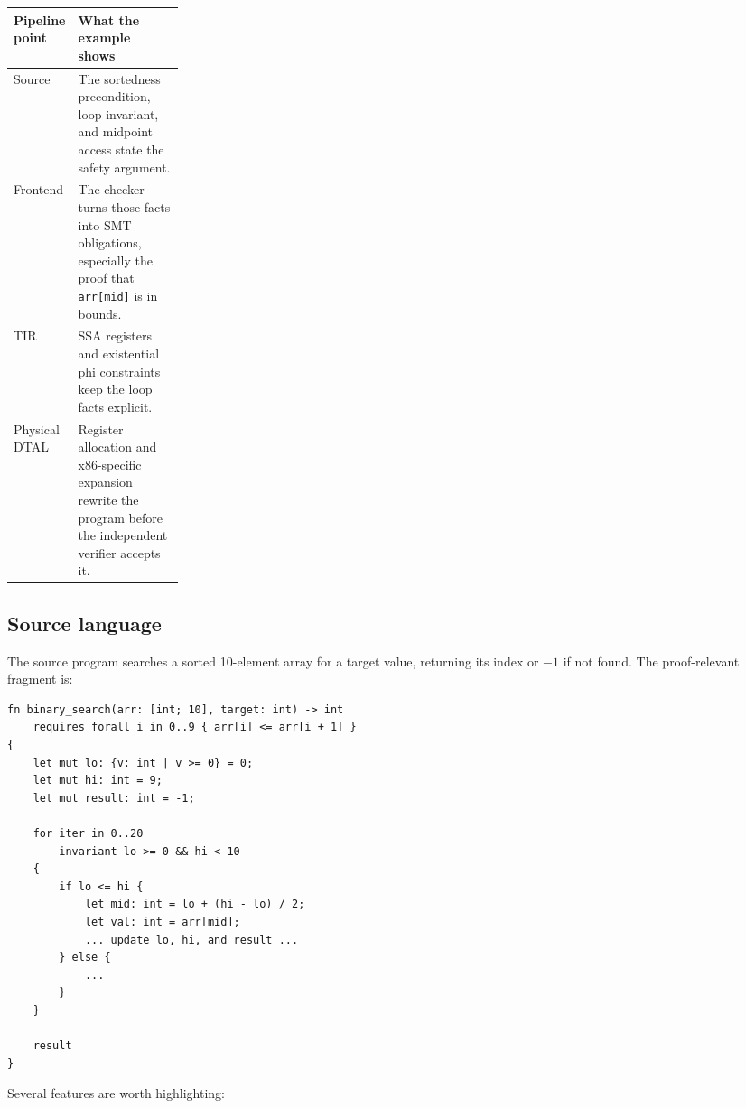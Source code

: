 \begin{center}
\small
\begin{tabularx}{0.96\linewidth}{@{}p{0.22\linewidth}X@{}}
\toprule
\textbf{Pipeline point} & \textbf{What the example shows} \\
\midrule
Source & The sortedness precondition, loop invariant, and midpoint access state the safety argument. \\
Frontend & The checker turns those facts into SMT obligations, especially the proof that \texttt{arr[mid]} is in bounds. \\
TIR & SSA registers and existential phi constraints keep the loop facts explicit. \\
Physical DTAL & Register allocation and x86-specific expansion rewrite the program before the independent verifier accepts it. \\
\bottomrule
\end{tabularx}
\end{center}

\subsection{Source language}
The source program searches a sorted 10-element array for a target value, returning its index or $-1$ if not found. The proof-relevant fragment is:
\begin{verbatim}
fn binary_search(arr: [int; 10], target: int) -> int
    requires forall i in 0..9 { arr[i] <= arr[i + 1] }
{
    let mut lo: {v: int | v >= 0} = 0;
    let mut hi: int = 9;
    let mut result: int = -1;

    for iter in 0..20
        invariant lo >= 0 && hi < 10
    {
        if lo <= hi {
            let mid: int = lo + (hi - lo) / 2;
            let val: int = arr[mid];
            ... update lo, hi, and result ...
        } else {
            ...
        }
    }

    result
}
\end{verbatim}
Several features are worth highlighting:

